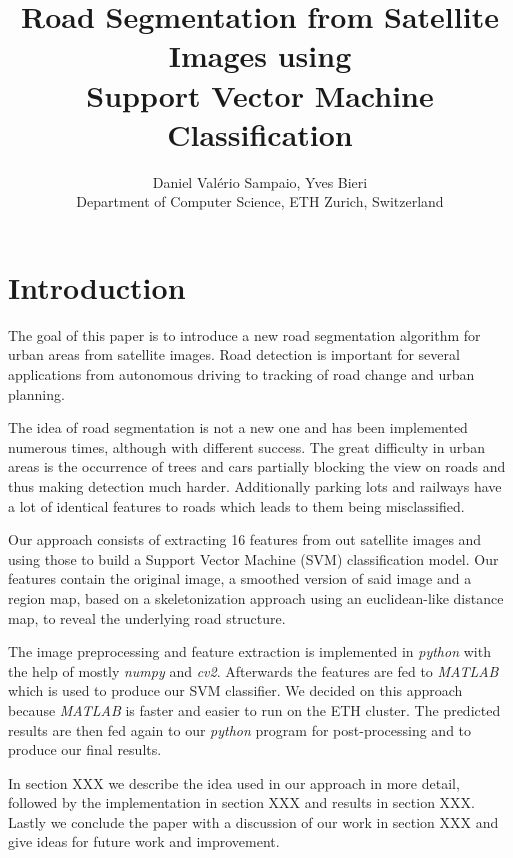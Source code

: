 \documentclass[10pt,conference,compsocconf]{IEEEtran}
\begin{document}
\title{Road Segmentation from Satellite Images using\\Support Vector Machine Classification}

\author{
  Daniel Val\'erio Sampaio, Yves Bieri\\
  Department of Computer Science, ETH Zurich, Switzerland
}

\maketitle

\begin{abstract}
	
\end{abstract}

\section{Introduction}

The goal of this paper is to introduce a new road segmentation algorithm for urban areas from satellite images. Road detection is important for several applications from autonomous driving to tracking
of road change and urban planning.

The idea of road segmentation is not a new one and has been implemented numerous times, although with
different success. The great difficulty in urban areas is the occurrence of trees and cars partially blocking the view on roads and thus making detection much harder. Additionally parking lots and railways have a lot of identical features to roads which leads to them being misclassified.

Our approach consists of extracting 16 features from out satellite images and using those to build a Support Vector Machine (SVM) classification model. Our features contain the original image, a smoothed version of said image and a region map, based on a skeletonization approach using an euclidean-like distance map, to reveal the underlying road structure.

The image preprocessing and feature extraction is implemented in \emph{python} with the help of mostly \emph{numpy} and \emph{cv2}. Afterwards the features are fed to \emph{MATLAB} which is used to produce our SVM classifier. We decided on this approach because \emph{MATLAB} is faster and easier to run on the ETH cluster. The predicted results are then fed again to our \emph{python} program for post-processing and to produce our final results.

In section XXX we describe the idea used in our approach in more detail,
followed by the implementation in section XXX and results in section XXX.
Lastly we conclude the paper with a discussion of our work in section XXX and 
give ideas for future work and improvement.
\end{document}
